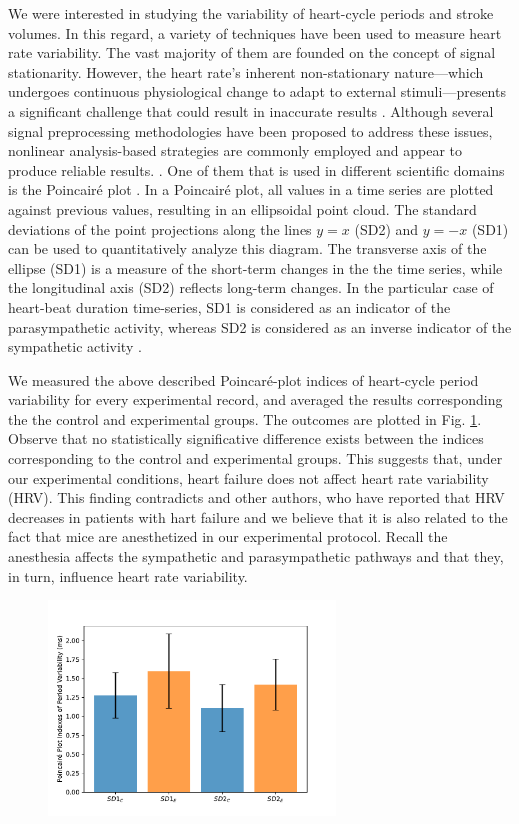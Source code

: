 \documentclass[%
preprint,
 amsmath,amssymb,
 aps,
]{revtex4-2}
\begin{document}
We were interested in studying the variability of heart-cycle periods and stroke volumes. In this regard, a variety of techniques have been used to measure heart rate variability. The vast majority of them are founded on the concept of signal stationarity. However, the heart rate's inherent non-stationary nature---which undergoes continuous physiological change to adapt to external stimuli---presents a significant challenge that could result in inaccurate results \citep{Marwan_2007}. Although several signal preprocessing methodologies have been proposed to address these issues, nonlinear analysis-based strategies are commonly employed and appear to produce reliable results. \citep{Marwan_2002, Aubert_2003, Marwan_2007, Giuliani_1998, Rajendra_Acharya_2006, Webber_1994, Henriques_2020}. One of them that is used in different scientific domains is the Poincairé plot \citep{Hoshi_2016, Webber_1994, Voss_2008}. In a Poincairé plot, all values in a time series are plotted against previous values, resulting in an ellipsoidal point cloud. The standard deviations of the point projections along the lines $y = x$ (SD2) and $y = -x$ (SD1) can be used to quantitatively analyze this diagram. The transverse axis of the ellipse (SD1) is a measure of the short-term changes in the the time series, while the longitudinal axis (SD2) reflects long-term changes. In the particular case of heart-beat duration time-series, SD1 is considered as an indicator of the parasympathetic activity, whereas SD2 is considered as an inverse indicator of the sympathetic activity \citep{Zimatore_2022}.

We measured the above described Poincaré-plot indices of heart-cycle period variability for every experimental record, and averaged the results corresponding the the control and experimental groups. The outcomes are plotted in Fig. \ref{fig:fig03}. Observe that no statistically significative difference exists between the indices corresponding to the control and experimental groups. This suggests that, under our experimental conditions, heart failure does not affect heart rate variability (HRV). This finding contradicts \citet{Kamen_1995} and other authors, who have reported that HRV decreases in patients with hart failure and we believe that it is also related to the fact that mice are anesthetized in our experimental protocol. Recall the anesthesia affects the sympathetic and parasympathetic pathways and that they, in turn, influence heart rate variability.

\begin{figure}[h!]
    \includegraphics[width=3in]{Fig03.pdf}
    \caption{}
    \label{fig:fig03}
\end{figure}
\end{document}
